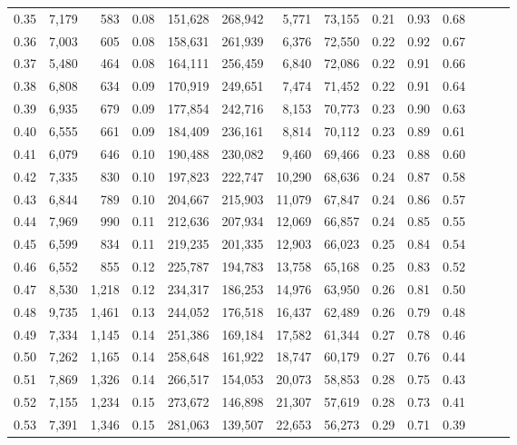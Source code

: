 \begin{tabular}{rrrrrrrrrrrrrr}
0.35 &  7,179 &    583 &  0.08 &  151,628 &  268,942 &   5,771 &  73,155 &  0.21 &  0.93 &      0.68 \\
0.36 &  7,003 &    605 &  0.08 &  158,631 &  261,939 &   6,376 &  72,550 &  0.22 &  0.92 &      0.67 \\
0.37 &  5,480 &    464 &  0.08 &  164,111 &  256,459 &   6,840 &  72,086 &  0.22 &  0.91 &      0.66 \\
0.38 &  6,808 &    634 &  0.09 &  170,919 &  249,651 &   7,474 &  71,452 &  0.22 &  0.91 &      0.64 \\
0.39 &  6,935 &    679 &  0.09 &  177,854 &  242,716 &   8,153 &  70,773 &  0.23 &  0.90 &      0.63 \\
0.40 &  6,555 &    661 &  0.09 &  184,409 &  236,161 &   8,814 &  70,112 &  0.23 &  0.89 &      0.61 \\
0.41 &  6,079 &    646 &  0.10 &  190,488 &  230,082 &   9,460 &  69,466 &  0.23 &  0.88 &      0.60 \\
0.42 &  7,335 &    830 &  0.10 &  197,823 &  222,747 &  10,290 &  68,636 &  0.24 &  0.87 &      0.58 \\
0.43 &  6,844 &    789 &  0.10 &  204,667 &  215,903 &  11,079 &  67,847 &  0.24 &  0.86 &      0.57 \\
0.44 &  7,969 &    990 &  0.11 &  212,636 &  207,934 &  12,069 &  66,857 &  0.24 &  0.85 &      0.55 \\
0.45 &  6,599 &    834 &  0.11 &  219,235 &  201,335 &  12,903 &  66,023 &  0.25 &  0.84 &      0.54 \\
0.46 &  6,552 &    855 &  0.12 &  225,787 &  194,783 &  13,758 &  65,168 &  0.25 &  0.83 &      0.52 \\
0.47 &  8,530 &  1,218 &  0.12 &  234,317 &  186,253 &  14,976 &  63,950 &  0.26 &  0.81 &      0.50 \\
0.48 &  9,735 &  1,461 &  0.13 &  244,052 &  176,518 &  16,437 &  62,489 &  0.26 &  0.79 &      0.48 \\
0.49 &  7,334 &  1,145 &  0.14 &  251,386 &  169,184 &  17,582 &  61,344 &  0.27 &  0.78 &      0.46 \\
0.50 &  7,262 &  1,165 &  0.14 &  258,648 &  161,922 &  18,747 &  60,179 &  0.27 &  0.76 &      0.44 \\
0.51 &  7,869 &  1,326 &  0.14 &  266,517 &  154,053 &  20,073 &  58,853 &  0.28 &  0.75 &      0.43 \\
0.52 &  7,155 &  1,234 &  0.15 &  273,672 &  146,898 &  21,307 &  57,619 &  0.28 &  0.73 &      0.41 \\
0.53 &  7,391 &  1,346 &  0.15 &  281,063 &  139,507 &  22,653 &  56,273 &  0.29 &  0.71 &      0.39 \\

\end{tabular}

